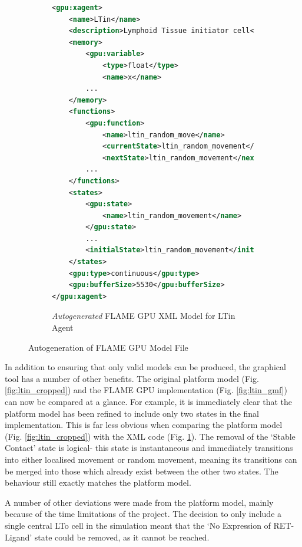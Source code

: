\documentclass{UoYCSproject}
\begin{document}
\begin{figure}[htp]
\begin{subfigure}{0.75\textwidth}
\centering
\begin{lstlisting}[language=XML, basicstyle=\tiny]
<gpu:xagent>
    <name>LTin</name>
    <description>Lymphoid Tissue initiator cell</description>
    <memory>
        <gpu:variable>
            <type>float</type>
            <name>x</name>
        ...
    </memory>
    <functions>
        <gpu:function>
            <name>ltin_random_move</name>
            <currentState>ltin_random_movement</currentState>
            <nextState>ltin_random_movement</nextState>
        ...
    </functions>
    <states>
        <gpu:state>
            <name>ltin_random_movement</name>
        </gpu:state>
        ...
        <initialState>ltin_random_movement</initialState>
    </states>
    <gpu:type>continuous</gpu:type>
    <gpu:bufferSize>5530</gpu:bufferSize>
</gpu:xagent>
\end{lstlisting}
\caption{\textit{Autogenerated} \gls{FLAME GPU} XML Model for LTin Agent}
\label{fig:xml_ltin}
\end{subfigure}

\caption{Autogeneration of \gls{FLAME GPU} Model File}
\label{fig:gmf_flame_generation}
\end{figure}

In addition to ensuring that only valid models can be produced, the graphical tool has a number of other benefits.
The original platform model (Fig. \ref{fig:ltin_cropped}) and the \gls{FLAME GPU} implementation (Fig. \ref{fig:ltin_gmf}) can now be compared at a glance.
For example, it is immediately clear that the platform model has been refined to include only two states in the final implementation.
This is far less obvious when comparing the platform model (Fig. \ref{fig:ltin_cropped}) with the XML code (Fig. \ref{fig:xml_ltin}).
The removal of the `Stable Contact' state is logical- this state is instantaneous and immediately transitions into either localised movement or random movement, meaning its transitions can be merged into those which already exist between the other two states.
The behaviour still exactly matches the platform model.

A number of other deviations were made from the platform model, mainly because of the time limitations of the project.
The decision to only include a single central \gls{LTo} cell in the simulation meant that the `No Expression of RET-Ligand' state could be removed, as it cannot be reached.
\end{document}
